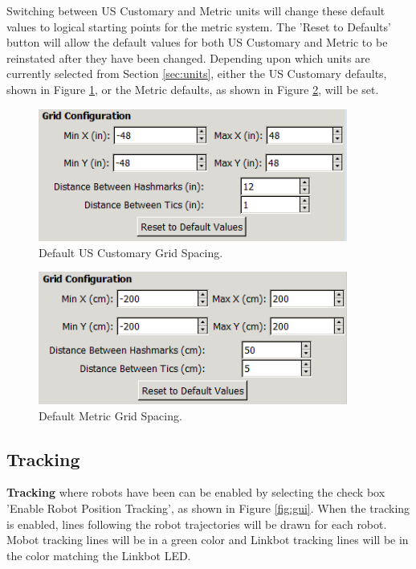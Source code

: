 \documentclass{article}
\begin{document}
Switching between US Customary and Metric units will change these default values
to logical starting points for the metric system.  The 'Reset to Defaults' button
will allow the default values for both US Customary and Metric to be reinstated
after they have been changed.  Depending upon which units are currently selected
from Section \ref{sec:units}, either the US Customary defaults, shown in Figure
\ref{fig:grid_us}, or the Metric defaults, as shown in Figure
\ref{fig:grid_metric}, will be set.
\begin{figure}[H]
	\begin{center}
		\includegraphics[width=4in]{images/gui_grid_us}
	\end{center}
	\caption{Default US Customary Grid Spacing.}
	\label{fig:grid_us}
\end{figure}
\begin{figure}[H]
	\begin{center}
		\includegraphics[width=4in]{images/gui_grid_si}
	\end{center}
	\caption{Default Metric Grid Spacing.}
	\label{fig:grid_metric}
\end{figure}

\subsection{Tracking}
{\bf Tracking} where robots have been can be enabled by selecting the check box
'Enable Robot Position Tracking', as shown in Figure \ref{fig:gui}.  When the
tracking is enabled, lines following the robot trajectories will be drawn for
each robot.  Mobot tracking lines will be in a green color and Linkbot tracking
lines will be in the color matching the Linkbot LED.
\end{document}
